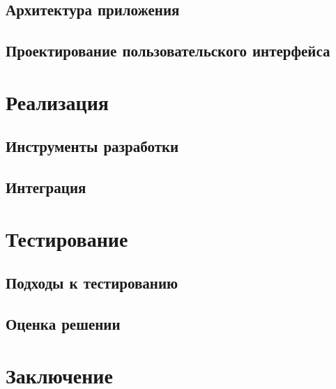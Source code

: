 	\subsection{Архитектура приложения}
	\subsection{Проектирование пользовательского интерфейса}

\section{Реализация}
	\subsection{Инструменты разработки}
	\subsection{Интеграция}

\section{Тестирование}
	\subsection{Подходы к тестированию}
	\subsection{Оценка решении}

\section*{Заключение}


% 
% 

